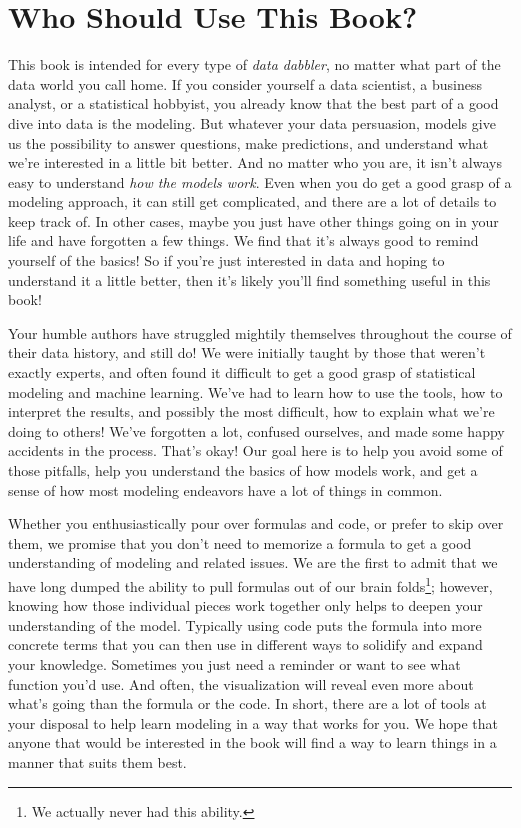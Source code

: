 \documentclass[
  letterpaper,
]{krantz}
\begin{document}
\section*{Who Should Use This Book?}\label{who-should-use-this-book}


This book is intended for every type of \emph{data dabbler}, no matter
what part of the data world you call home. If you consider yourself a
data scientist, a business analyst, or a statistical hobbyist, you
already know that the best part of a good dive into data is the
modeling. But whatever your data persuasion, models give us the
possibility to answer questions, make predictions, and understand what
we're interested in a little bit better. And no matter who you are, it
isn't always easy to understand \emph{how the models work}. Even when
you do get a good grasp of a modeling approach, it can still get
complicated, and there are a lot of details to keep track of. In other
cases, maybe you just have other things going on in your life and have
forgotten a few things. We find that it's always good to remind yourself
of the basics! So if you're just interested in data and hoping to
understand it a little better, then it's likely you'll find something
useful in this book!

Your humble authors have struggled mightily themselves throughout the
course of their data history, and still do! We were initially taught by
those that weren't exactly experts, and often found it difficult to get
a good grasp of statistical modeling and machine learning. We've had to
learn how to use the tools, how to interpret the results, and possibly
the most difficult, how to explain what we're doing to others! We've
forgotten a lot, confused ourselves, and made some happy accidents in
the process. That's okay! Our goal here is to help you avoid some of
those pitfalls, help you understand the basics of how models work, and
get a sense of how most modeling endeavors have a lot of things in
common.

Whether you enthusiastically pour over formulas and code, or prefer to
skip over them, we promise that you don't need to memorize a formula to
get a good understanding of modeling and related issues. We are the
first to admit that we have long dumped the ability to pull formulas out
of our brain folds\footnote{We actually never had this ability.};
however, knowing how those individual pieces work together only helps to
deepen your understanding of the model. Typically using code puts the
formula into more concrete terms that you can then use in different ways
to solidify and expand your knowledge. Sometimes you just need a
reminder or want to see what function you'd use. And often, the
visualization will reveal even more about what's going than the formula
or the code. In short, there are a lot of tools at your disposal to help
learn modeling in a way that works for you. We hope that anyone that
would be interested in the book will find a way to learn things in a
manner that suits them best.
\end{document}
